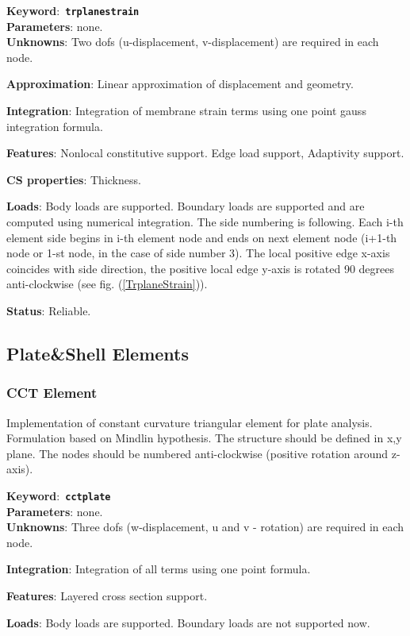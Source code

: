 \documentclass[a4paper]{article}
\newcommand{\descitem}[1]{{\noindent \bf #1}:}
\newcommand{\elemkeyword}[1]{\descitem{Keyword}~{\bf \texttt{#1}}}
\begin{document}
\elemkeyword{trplanestrain}\\
\descitem{Parameters} none.\\
\descitem{Unknowns}
Two dofs (u-displacement, v-displacement) are required in each node.

\descitem{Approximation} Linear approximation of displacement and
geometry.

\descitem{Integration}
Integration of membrane strain terms using one point gauss integration formula.

\descitem{Features} Nonlocal constitutive support. Edge load
support, Adaptivity support.

\descitem{CS properties} Thickness. 

\descitem{Loads} Body loads are supported. Boundary loads are
supported and are computed  using numerical integration. The side numbering is
following. Each i-th element side begins in i-th element node and
ends on next element node (i+1-th node or 1-st node, in the case of 
side number 3). The local positive edge x-axis coincides with side
direction, the positive local edge y-axis is rotated 90 degrees
anti-clockwise (see fig. (\ref{TrplaneStrain})).

\descitem{Status} Reliable.



\subsection{Plate\&Shell Elements}
\subsubsection {CCT Element}
Implementation of constant curvature triangular element for plate
analysis. Formulation based on Mindlin hypothesis. The structure should be defined in x,y plane. 
The nodes should be numbered anti-clockwise (positive rotation around
z-axis). 


\elemkeyword{cctplate}\\
\descitem{Parameters} none.\\
\descitem{Unknowns}
Three dofs (w-displacement, u and v - rotation) are required in each node.


\descitem{Integration}
Integration of all terms using one point formula.

\descitem{Features} Layered cross section support.

\descitem{Loads} Body loads are supported. Boundary loads are
not supported now.
\end{document}
